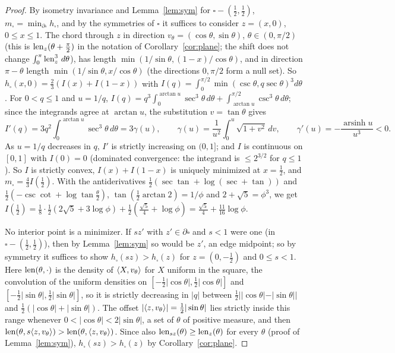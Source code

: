 \documentclass[11pt]{article}
\begin{document}
\begin{proof}
By isometry invariance and Lemma~\ref{lem:sym} for $\square-(\frac12,\frac12)$, $m_\square=\min_{\partial\square}h_\square$, and by the
symmetries of $\square$ it suffices to consider $z=(x,0)$, $0\le x\le1$. The chord through $z$ in direction $v_\theta=(\cos\theta,\sin\theta)$, $\theta\in(0,\pi/2)$ (this is
$\operatorname{len}_z(\theta+\frac\pi2)$ in the notation of Corollary~\ref{cor:plane}; the shift does not change $\int_0^\pi\operatorname{len}_z^3\,d\theta$), has length $\min(1/\sin\theta,(1-x)/\cos\theta)$, and in direction $\pi-\theta$ length $\min(1/\sin\theta,x/\cos\theta)$ (the
directions $0,\pi/2$ form a null set). So $h_\square(x,0)=\frac23(I(x)+I(1-x))$ with $I(q)=\int_0^{\pi/2}\min(\csc\theta,q\sec\theta)^3d\theta$. For
$0<q\le1$ and $u=1/q$, $I(q)=q^3\int_0^{\arctan u}\sec^3\theta\,d\theta+\int_{\arctan u}^{\pi/2}\csc^3\theta\,d\theta$; since the integrands agree at $\arctan u$,
the substitution $v=\tan\theta$ gives
\[
  I'(q)=3q^2\int_0^{\arctan u}\sec^3\theta\,d\theta=3\gamma(u),\qquad \gamma(u)=\frac1{u^2}\int_0^u\sqrt{1+v^2}\,dv,\qquad \gamma'(u)=-\frac{\operatorname{arsinh}u}{u^3}<0.
\]
As $u=1/q$ decreases in $q$, $I'$ is strictly increasing on $(0,1]$; and $I$ is continuous on $[0,1]$ with $I(0)=0$ (dominated
convergence: the integrand is $\le2^{3/2}$ for $q\le1$). So $I$ is strictly convex, $I(x)+I(1-x)$ is uniquely minimized at $x=\frac12$,
and $m_\square=\frac43I(\frac12)$. With the antiderivatives $\frac12(\sec\tan+\log(\sec+\tan))$ and $\frac12(-\csc\cot+\log\tan\frac\theta2)$,
$\tan(\frac12\arctan2)=1/\phi$ and $2+\sqrt5=\phi^3$, we get
$I(\frac12)=\frac18\cdot\frac12(2\sqrt5+3\log\phi)+\frac12(\frac{\sqrt5}4+\log\phi)=\frac{\sqrt5}4+\frac{11}{16}\log\phi$.

No interior point is a minimizer. If $sz'$ with $z'\in\partial\square$ and $s<1$ were one (in $\square-(\frac12,\frac12)$), then by
Lemma~\ref{lem:sym} so would be $z'$, an edge midpoint; so by symmetry it suffices to show $h_\square(sz)>h_\square(z)$ for $z=(0,-\frac12)$
and $0\le s<1$. Here $\operatorname{len}(\theta,\cdot)$ is the density of $\langle X,v_\theta\rangle$ for $X$ uniform in the square, the convolution of the uniform
densities on $[-\frac12|\cos\theta|,\frac12|\cos\theta|]$ and $[-\frac12|\sin\theta|,\frac12|\sin\theta|]$, so it is strictly decreasing in $|q|$ between
$\frac12||\cos\theta|-|\sin\theta||$ and $\frac12(|\cos\theta|+|\sin\theta|)$. The offset $|\langle z,v_\theta\rangle|=\frac12|\sin\theta|$ lies strictly inside this range
whenever $0<|\cos\theta|<2|\sin\theta|$, a set of $\theta$ of positive measure, and then $\operatorname{len}(\theta,s\langle z,v_\theta\rangle)>\operatorname{len}(\theta,\langle z,v_\theta\rangle)$. Since also
$\operatorname{len}_{sz}(\theta)\ge\operatorname{len}_z(\theta)$ for every $\theta$ (proof of Lemma~\ref{lem:sym}), $h_\square(sz)>h_\square(z)$ by Corollary~\ref{cor:plane}.
\end{proof}
\end{document}
